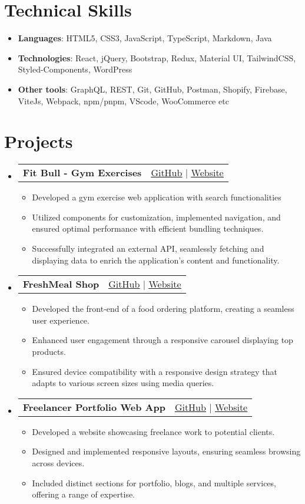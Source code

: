\documentclass[letterpaper,11pt]{article}
\makeatletter
\newcommand{\resumeItem}[1]{
  \item\small{
    {#1 \vspace{-2pt}}
  }
}
\newcommand{\resumeProjectHeading}[2]{
    \item
    \begin{tabular*}{0.97\textwidth}{l@{\extracolsep{\fill}}r}
      \small#1 & #2 \\
    \end{tabular*}\vspace{-7pt}
}
\newcommand{\resumeSubHeadingListStart}{\begin{itemize}[leftmargin=0.15in, label={}]}
\newcommand{\resumeSubHeadingListEnd}{\end{itemize}}
\newcommand{\resumeItemListStart}{\begin{itemize}}
\newcommand{\resumeItemListEnd}{\end{itemize}\vspace{-5pt}}
\makeatother
\begin{document}
%
\section{Technical Skills}
\resumeItemListStart
            \resumeItem{\textbf{Languages}{: HTML5, CSS3, JavaScript, TypeScript, Markdown, Java}}
            \resumeItem{\textbf{Technologies}{: React, jQuery, Bootstrap, Redux, Material UI, TailwindCSS, Styled-Components, WordPress}}
            \resumeItem{\textbf{Other tools}{: GraphQL, REST, Git, GitHub, Postman, Shopify, Firebase, ViteJs, Webpack, npm/pnpm, VScode, WooCommerce etc}}
\resumeItemListEnd


\section{Projects}
    \resumeSubHeadingListStart
        \resumeProjectHeading
          {\textbf{Fit Bull - Gym Exercises}}
          {{ {\small {\faGithub} \href{https://github.com/dushmanta05/fit-bull}{\underline{GitHub}}} $|$ {\small {\faGlobe} \href{https://fit-bull.netlify.app/}{{\underline{Website}}}}}}
          \resumeItemListStart
            \resumeItem{Developed a gym exercise web application with search functionalities}
            \resumeItem{Utilized components for customization, implemented navigation, and ensured optimal performance with efficient bundling techniques.}
            \resumeItem{Successfully integrated an external API, seamlessly fetching and displaying data to enrich the application's content and functionality.}
          \resumeItemListEnd
        \resumeProjectHeading
          {\textbf{FreshMeal Shop}}
          {{ {\small {\faGithub} \href{https://github.com/dushmanta05/fresh-kart}{\underline{GitHub}}} $|$ {\small {\faGlobe} \href{https://fresh-kart.vercel.app/}{{\underline{Website}}}}}}
          \resumeItemListStart
            \resumeItem{Developed the front-end of a food ordering platform, creating a seamless user experience.}
            \resumeItem{Enhanced user engagement through a responsive carousel displaying top products.}
            \resumeItem{ Ensured device compatibility with a responsive design strategy that adapts to various screen sizes using media queries.}
          \resumeItemListEnd
      \resumeProjectHeading
          {\textbf{Freelancer Portfolio Web App}}
          {{ {\small {\faGithub} \href{https://github.com/dushmanta05/byteverse}{\underline{GitHub}}} $|$ {\small {\faGlobe} \href{https://byteverse.vercel.app/}{{\underline{Website}}}}}}
          \resumeItemListStart
            \resumeItem{Developed a website showcasing freelance work to potential clients.}
            \resumeItem{Designed and implemented responsive layouts, ensuring seamless browsing across devices.}
            \resumeItem{ Included distinct sections for portfolio, blogs, and multiple services, offering a range of expertise.}
          \resumeItemListEnd
    \resumeSubHeadingListEnd
\end{document}
